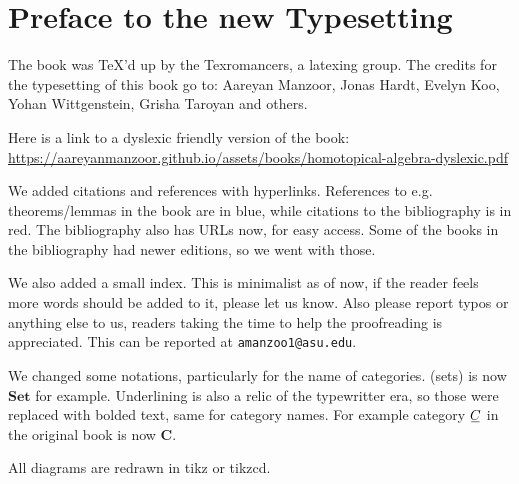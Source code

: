 \documentclass[../main]{subfiles}
\begin{document}
\chapter*{Preface to the new Typesetting}

The book was TeX'd up by the Texromancers, a latexing group. The credits for the typesetting of this book go to:  Aareyan Manzoor, Jonas Hardt, Evelyn Koo, Yohan Wittgenstein, Grisha Taroyan and others.

Here is a link to a dyslexic friendly version of the book:
\url{https://aareyanmanzoor.github.io/assets/books/homotopical-algebra-dyslexic.pdf}

We added citations and references with hyperlinks. References to e.g. theorems/lemmas in the book are in blue, while citations to the bibliography is
in red. The bibliography also has URLs now, for easy access. Some of the books
in the bibliography had newer editions, so we went with those.

We also added a small index. This is minimalist as of now, if the reader feels more words should be added to it, please let us know. Also please report typos or anything else to us, readers taking the time to help the proofreading is appreciated. This can be reported at \texttt{amanzoo1@asu.edu}.

We changed some notations, particularly for the name of categories. (sets) is now $\mathbf{Set}$ for example. Underlining is also a relic of the typewritter era, so those were replaced with bolded text, same for category names. For example category $\xunderline{C}$ in the original book is now $\mathbf{C}$.

All diagrams are redrawn in tikz or tikzcd.
\end{document}
